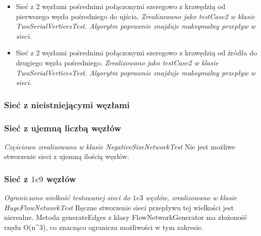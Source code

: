 \begin{itemize}[nosep]
    \item Sieć z 2 węzłami pośrednimi połączonymi szeregowo z krawędzią od
    pierwszego węzła pośredniego do ujścia.
    \emph{Zrealizowano jako testCase2 w klasie TwoSerialVerticesTest. Algorytm
    poprawnie znajduje maksymalny przepływ w sieci.}

    \item Sieć z 2 węzłami pośrednimi połączonymi szeregowo z krawędzią od
    źródła do drugiego węzła pośredniego.
    \emph{Zrealizowano jako testCase2 w klasie TwoSerialVerticesTest. Algorytm
    poprawnie znajduje maksymalny przepływ w sieci.}

\end{itemize}


\subsubsection{Sieć z nieistniejącymi węzłami}


\subsubsection{Sieć z ujemną liczbą węzłów}
\emph{Częściowo zrealizowano w klasie NegativeSizeNetworkTest}
Nie jest możliwe stworzenie sieci z ujemną ilością węzłów.

\subsubsection{Sieć z $1e9$ węzłów}
\emph{Ograniczono wielkość testowanej sieci do $1e3$ węzłów, zrealizowano w klasie HugeFlowNetworkTest}
Ręczne stworzenie sieci przepływu tej wielkości jest nierealne.
Metoda generateEdges z klasy FlowNetworkGenerator ma złożoność rzędu O(n^3),
co znacząco ogranicza możliwości w tym zakresie.

